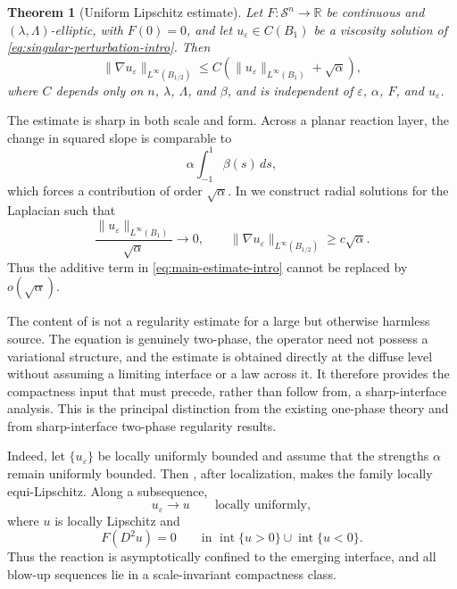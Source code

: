 \documentclass[11pt,letterpaper]{amsart}
\numberwithin{equation}{section}
\newcommand{\Sn}{\mathcal S^n}
\newcommand{\eps}{\varepsilon}
\newtheorem{theorem}{Theorem}[section]
\theoremstyle{definition}
\theoremstyle{remark}
\begin{document}
\begin{theorem}[Uniform Lipschitz estimate]\label{thm:main-intro}
Let $F:\Sn\to\mathbb R$ be continuous and $(\lambda,\Lambda)$-elliptic, with
$F(0)=0$, and let $u_\eps\in C(B_1)$ be a viscosity solution of
\eqref{eq:singular-perturbation-intro}. Then
\begin{equation}\label{eq:main-estimate-intro}
\|\nabla u_\eps\|_{L^\infty(B_{1/2})}
\leq
C\left(
\|u_\eps\|_{L^\infty(B_1)}+\sqrt\alpha
\right),
\end{equation}
where $C$ depends only on $n$, $\lambda$, $\Lambda$, and $\beta$, and is
independent of $\eps$, $\alpha$, $F$, and $u_\eps$.
\end{theorem}

The estimate is sharp in both scale and form. Across a planar reaction layer,
the change in squared slope is comparable to
$$
\alpha\int_{-1}^{1}\beta(s)\,ds,
$$
which forces a contribution of order $\sqrt\alpha$. In
 we construct radial solutions for the Laplacian such that
$$
\frac{\|u_\eps\|_{L^\infty(B_1)}}{\sqrt\alpha}
\longrightarrow0,
\qquad
\|\nabla u_\eps\|_{L^\infty(B_{1/2})}
\geq c\sqrt\alpha.
$$
Thus the additive term in \eqref{eq:main-estimate-intro} cannot be replaced by
$o(\sqrt\alpha)$.

The content of  is not a regularity estimate for a large
but otherwise harmless source. The equation is genuinely two-phase, the
operator need not possess a variational structure, and the estimate is
obtained directly at the diffuse level without assuming a limiting interface
or a law across it. It therefore provides the compactness input that must
precede, rather than follow from, a sharp-interface analysis. This is the
principal distinction from the existing one-phase theory and from
sharp-interface two-phase regularity results.

Indeed, let $\{u_\eps\}$ be locally uniformly bounded and assume that the
strengths $\alpha$ remain uniformly bounded. Then
, after localization, makes the family locally
equi-Lipschitz. Along a subsequence,
$$
u_\eps\longrightarrow u
\qquad\text{locally uniformly},
$$
where $u$ is locally Lipschitz and
$$
F(D^2u)=0
\qquad\text{in }
\operatorname{int}\{u>0\}\cup\operatorname{int}\{u<0\}.
$$
Thus the reaction is asymptotically confined to the emerging interface, and
all blow-up sequences lie in a scale-invariant compactness class.
\end{document}
